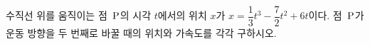 수직선 위를 움직이는 점~$\mathrm{P}$의 시각 $t$에서의 위치 $x$가 $x=\dfrac{1}{3}t^3-\dfrac{7}{2}t^2+6t$이다. 점~$\mathrm{P}$가 운동 방향을 두 번째로 바꿀 때의 위치와 가속도를 각각 구하시오.
